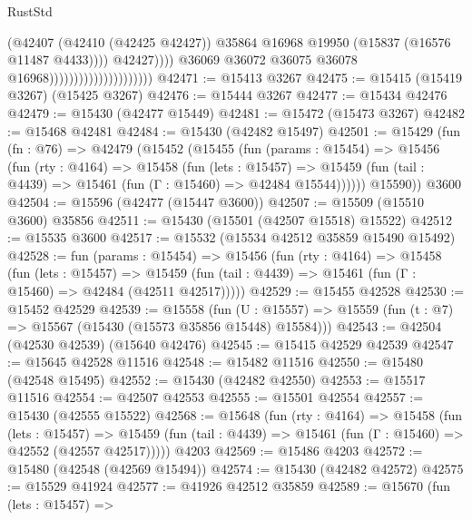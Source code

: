 \begin{lexlean}{RustStd}
\begin{coremodule}
                                                        (@42407
                                                          (@42410 (@42425 @42427))
                                                          @35864
                                                          @16968
                                                          @19950
                                                          (@15837 (@16576 @11487 @4433))))
                                                      @42427))))
                                              @36069
                                              @36072
                                              @36075
                                              @36078
                                              @16968)))))))))))))))))))))
@42471 := @15413 @3267
@42475 := @15415 (@15419 @3267) (@15425 @3267)
@42476 := @15444 @3267
@42477 := @15434 @42476
@42479 := @15430 (@42477 @15449)
@42481 := @15472 (@15473 @3267)
@42482 := @15468 @42481
@42484 := @15430 (@42482 @15497)
@42501 := @15429
    (fun (fn : @76) =>
    @42479
      (@15452
        (@15455
          (fun (params : @15454) =>
          @15456
            (fun (rty : @4164) =>
            @15458
              (fun (lets : @15457) =>
              @15459 (fun (tail : @4439) => @15461 (fun (Γ : @15460) => @42484 @15544))))))
        @15590))
    @3600
@42504 := @15596 (@42477 (@15447 @3600))
@42507 := @15509 (@15510 @3600) @35856
@42511 := @15430 (@15501 (@42507 @15518) @15522)
@42512 := @15535 @3600
@42517 := @15532 (@15534 @42512 @35859 @15490 @15492)
@42528 := fun (params : @15454) =>
  @15456
    (fun (rty : @4164) =>
    @15458
      (fun (lets : @15457) =>
      @15459 (fun (tail : @4439) => @15461 (fun (Γ : @15460) => @42484 (@42511 @42517)))))
@42529 := @15455 @42528
@42530 := @15452 @42529
@42539 := @15558
    (fun (U : @15557) => @15559 (fun (t : @7) => @15567 (@15430 (@15573 @35856 @15448) @15584)))
@42543 := @42504 (@42530 @42539) (@15640 @42476)
@42545 := @15415 @42529 @42539
@42547 := @15645 @42528 @11516
@42548 := @15482 @11516
@42550 := @15480 (@42548 @15495)
@42552 := @15430 (@42482 @42550)
@42553 := @15517 @11516
@42554 := @42507 @42553
@42555 := @15501 @42554
@42557 := @15430 (@42555 @15522)
@42568 := @15648
    (fun (rty : @4164) =>
    @15458
      (fun (lets : @15457) =>
      @15459 (fun (tail : @4439) => @15461 (fun (Γ : @15460) => @42552 (@42557 @42517)))))
    @4203
@42569 := @15486 @4203
@42572 := @15480 (@42548 (@42569 @15494))
@42574 := @15430 (@42482 @42572)
@42575 := @15529 @41924
@42577 := @41926 @42512 @35859
@42589 := @15670
    (fun (lets : @15457) =>

\end{coremodule}
\end{lexlean}
